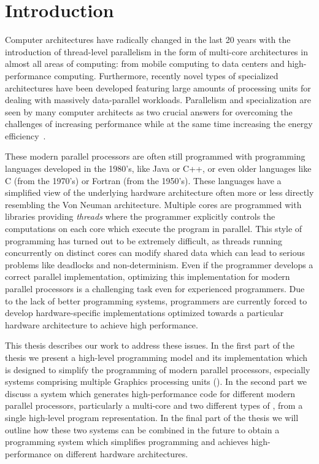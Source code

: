 
\chapter{Introduction} %

\label{ch:introduction} %

Computer architectures have radically changed in the last 20 years with the introduction of thread-level parallelism in the form of multi-core architectures in almost all areas of computing:
from mobile computing to data centers and high-performance computing.
Furthermore, recently novel types of specialized architectures have been developed featuring large amounts of processing units for dealing with massively data-parallel workloads.
Parallelism and specialization are seen by many computer architects as two crucial answers for overcoming the challenges of increasing performance while at the same time increasing the energy efficiency~\cite{}.

These modern parallel processors are often still programmed with programming languages developed in the 1980's, like Java or C++, or even older languages like C (from the 1970's) or Fortran (from the 1950's).
These languages have a simplified view of the underlying hardware architecture often more or less directly resembling the Von Neuman architecture.
Multiple cores are programmed with libraries providing \emph{threads} where the programmer explicitly controls the computations on each core which execute the program in parallel.
This style of programming has turned out to be extremely difficult, as threads running concurrently on distinct cores can modify shared data which can lead to serious problems like deadlocks and non-determinism.
Even if the programmer develops a correct parallel implementation, optimizing this implementation for modern parallel processors is a challenging task even for experienced programmers.
Due to the lack of better programming systems, programmers are currently forced to develop hardware-specific implementations optimized towards a particular hardware architecture to achieve high performance.

This thesis describes our work to address these issues.
In the first part of the thesis we present a high-level programming model and its implementation which is designed to simplify the programming of modern parallel processors, especially systems comprising multiple Graphics processing units (\GPUs).
In the second part we discuss a system which generates high-performance code for different modern parallel processors, particularly a multi-core \CPU and two different types of \GPUs, from a single high-level program representation.
In the final part of the thesis we will outline how these two systems can be combined in the future to obtain a programming system which simplifies programming and achieves high-performance on different hardware architectures.

